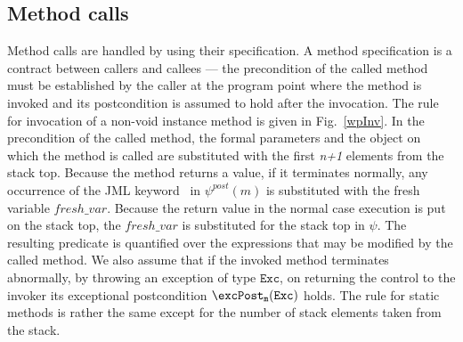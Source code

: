 \subsection{Method calls}
Method calls are handled by using their specification. A method specification is a contract between callers and callees --- the precondition of the called method
must be established by the caller at the program point where the method is invoked and its postcondition is assumed to hold after the invocation. The rule for
invocation of a non-void instance method is given in Fig.~\ref{wpInv}. In the precondition of the called method, the formal parameters and the object on which the method is called are substituted with the first \textit{n+1} elements from the stack top. 
Because the method returns a value, if it terminates normally, any occurrence of the JML keyword \result \ in $\psi^{post}(m)$ is substituted with the fresh variable $fresh\_var$.  
Because the return value in the normal case execution is put on the stack top, the $fresh\_var$ is substituted for the stack top in $\psi$. The resulting predicate is quantified over the expressions that may be modified by the called method. We also assume that if the invoked method terminates abnormally, by throwing an exception of type $\texttt{Exc}$, on returning the control to the invoker its exceptional postcondition $\excPost_{\tt{m} }( \tt{Exc} )$ holds. 
The rule for static methods is rather the same except for the number of stack elements taken from the stack.  

